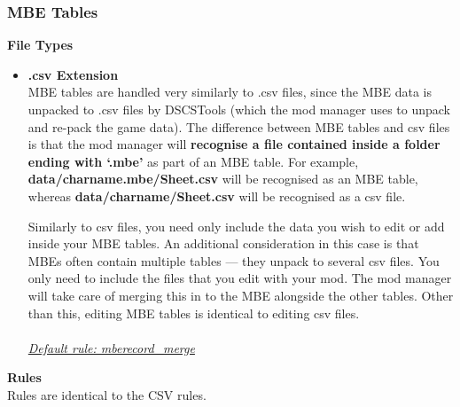 \documentclass{article}
\begin{document}
\subsubsection{MBE Tables}
\textbf{File Types}
\begin{itemize}
\item \textbf{.csv Extension}\\
MBE tables are handled very similarly to .csv files, since the MBE data is unpacked to .csv files by DSCSTools (which the mod manager uses to unpack and re-pack the game data). The difference between MBE tables and csv files is that the mod manager will \textbf{recognise a file contained inside a folder ending with `.mbe'} as part of an MBE table. For example, \textbf{data/charname.mbe/Sheet.csv} will be recognised as an MBE table, whereas  \textbf{data/charname/Sheet.csv} will be recognised as a csv file.

Similarly to csv files, you need only include the data you wish to edit or add inside your MBE tables. An additional consideration in this case is that MBEs often contain multiple tables --- they unpack to several csv files. You only need to include the files that you edit with your mod. The mod manager will take care of merging this in to the MBE alongside the other tables. Other than this, editing MBE tables is identical to editing csv files.\\\\
\underline{\textit{Default rule: mberecord\_merge}}
\end{itemize}
\textbf{Rules}\\
Rules are identical to the CSV rules.
\end{document}
